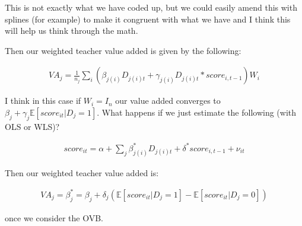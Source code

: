\documentclass[letterpaper,12pt]{article}
\begin{document}
\noindent This is not exactly what we have coded up, but we could easily amend this with splines (for example) to make it congruent with what we have and I think this will help us think through the math.

Then our weighted teacher value added is given by the following:

    \begin{align*}
        VA_j = \frac{1}{n_j} \sum_i (\beta_{j(i)}D_{j(i)t} + \gamma_{j(i)} D_{j(i)t}  * score_{i, t-1})W_i
    \end{align*}
    
\noindent I think in this case if $W_i = I_n$ our value added converges to $\beta_j + \gamma_j \mathbb{E}[score_{it} | D_j = 1]$. What happens if we just estimate the following (with OLS or WLS)?

    \begin{align*}
        score_{it} = \alpha + \sum_j \beta^*_{j(i)}D_{j(i)t} + \delta^* score_{i,t-1} + \nu_{it}
    \end{align*}
    
Then our weighted teacher value added is:

    \begin{align*}
        VA_j = \beta^*_j = \beta_j + \delta_j(\mathbb{E}[score_{it} | D_j = 1] - \mathbb{E}[score_{it} | D_j = 0])
    \end{align*}
    
\noindent once we consider the OVB.
\end{document}
